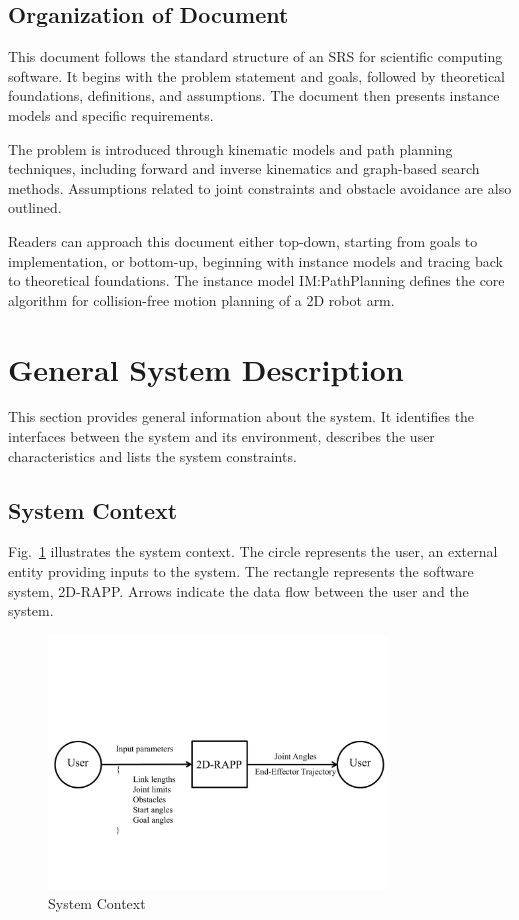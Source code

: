 \documentclass[12pt]{article}
\begin{document}
\subsection{Organization of Document}

This document follows the standard structure of an SRS for scientific computing software. It begins with the problem statement and goals, followed by theoretical foundations, definitions, and assumptions. The document then presents instance models and specific requirements.

The problem is introduced through kinematic models and path planning techniques, including forward and inverse kinematics and graph-based search methods. Assumptions related to joint constraints and obstacle avoidance are also outlined.

Readers can approach this document either top-down, starting from goals to implementation, or bottom-up, beginning with instance models and tracing back to theoretical foundations. The instance model IM:PathPlanning defines the core algorithm for collision-free motion planning of a 2D robot arm.


\section{General System Description}

This section provides general information about the system.  It identifies the
interfaces between the system and its environment, describes the user
characteristics and lists the system constraints. 


\subsection{System Context}


Fig.~\ref{Fig:SysCon} illustrates the system context. The circle represents the user, an external entity providing inputs to the system. The rectangle represents the software system, 2D-RAPP. Arrows indicate the data flow between the user and the system.

\begin{figure}[h!]
\centering
\includegraphics[width=0.8\textwidth]{SystemContextFigure}
\caption{System Context}
\label{Fig:SysCon}
\end{figure}
\end{document}

